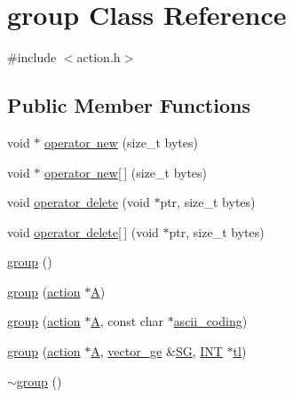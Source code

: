 \hypertarget{classgroup}{}\section{group Class Reference}
\label{classgroup}


{\ttfamily \#include $<$action.\+h$>$}

\subsection*{Public Member Functions}
\begin{DoxyCompactItemize}
\item 
void $\ast$ \mbox{\hyperlink{classgroup_ab08eef442f3de180d318a193a552ea62}{operator new}} (size\+\_\+t bytes)
\item 
void $\ast$ \mbox{\hyperlink{classgroup_af6a6a483cf4b50f0d7bde93868a99188}{operator new\mbox{[}$\,$\mbox{]}}} (size\+\_\+t bytes)
\item 
void \mbox{\hyperlink{classgroup_ae380168e077611192c14587fdce90a08}{operator delete}} (void $\ast$ptr, size\+\_\+t bytes)
\item 
void \mbox{\hyperlink{classgroup_a17e8505bd7a8bf87eea1df46ab09f078}{operator delete\mbox{[}$\,$\mbox{]}}} (void $\ast$ptr, size\+\_\+t bytes)
\item 
\mbox{\hyperlink{classgroup_ad9d5836aea085e5b55ecb077d15a6189}{group}} ()
\item 
\mbox{\hyperlink{classgroup_a84a8809f0d07b5ebcd1b8e6273bccc03}{group}} (\mbox{\hyperlink{classaction}{action}} $\ast$\mbox{\hyperlink{classgroup_a056e73bdc68f2d6db4cd20191ef67959}{A}})
\item 
\mbox{\hyperlink{classgroup_a4b5532e8c8132fedadb68d4bbd0d4ca0}{group}} (\mbox{\hyperlink{classaction}{action}} $\ast$\mbox{\hyperlink{classgroup_a056e73bdc68f2d6db4cd20191ef67959}{A}}, const char $\ast$\mbox{\hyperlink{classgroup_a8e5590d1f87a58dbb8bf29b2bfbd91c4}{ascii\+\_\+coding}})
\item 
\mbox{\hyperlink{classgroup_aab93320d8baed6178663d341d58994b0}{group}} (\mbox{\hyperlink{classaction}{action}} $\ast$\mbox{\hyperlink{classgroup_a056e73bdc68f2d6db4cd20191ef67959}{A}}, \mbox{\hyperlink{classvector__ge}{vector\+\_\+ge}} \&\mbox{\hyperlink{classgroup_a4a4b982f7a7348eb4951cfa806f4b3d3}{SG}}, \mbox{\hyperlink{galois_8h_a09fddde158a3a20bd2dcadb609de11dc}{I\+NT}} $\ast$\mbox{\hyperlink{classgroup_a2e0472009d44da381602bfab8bdd28c5}{tl}})
\item 
\mbox{\hyperlink{classgroup_a1004fae3de56db559882f3e77623f844}{$\sim$group}} ()

\end{DoxyCompactItemize}
